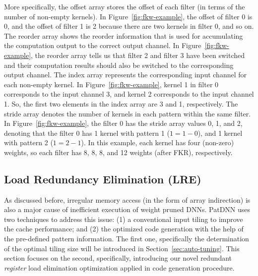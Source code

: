 \documentclass[sigplan,screen]{acmart}
\begin{document}
More specifically, the offset array stores the offset of each filter (in terms of the number of non-empty kernels). In Figure~\ref{fig:fkw-example}, the offset of filter 0 is 0, and the offset of filter 1 is 2 because there are two kernels in filter 0, and so on. 
The reorder array shows the reorder information that is used for accumulating the computation output to the correct output channel. In Figure~\ref{fig:fkw-example}, the reorder array tells us that filter 2 and filter 3 have been switched and their computation results should also be switched to the corresponding output channel. The index array represents the corresponding input channel for each non-empty kernel. In Figure~\ref{fig:fkw-example}, kernel 1 in filter 0 corresponds to the input channel 3, and kernel 2 corresponds to the input channel 1. So, the first two elements in the index array are 3 and 1, respectively. 
The stride array denotes the number of kernels in each pattern within the same filter. In Figure~\ref{fig:fkw-example}, the filter 0 has the stride array values 0, 1, and 2, denoting that
the filter 0 has 
1 kernel with pattern 1 ($1 = 1 - 0$), and 1 kernel with pattern 2 ($1 = 2 - 1$).
In this example, each kernel has four (non-zero) weights, so each filter has 8, 8, 8, and 12 weights (after FKR), respectively. 





\subsection{Load Redundancy Elimination (LRE)}\label{sec:redundancy}










As discussed before, irregular memory access (in the form of array indirection) is also a major cause of inefficient execution of weight pruned DNNs.   
PatDNN uses two techniques to address this issue: 
(1) a conventional input tiling to improve the cache performance; and 
(2) the optimized code generation
with the help of the pre-defined pattern information.
The first one, specifically the determination of the optimal tiling size  will be introduced in Section~\ref{sec:auto-tuning}. 
This section focuses on the second, specifically, introducing our novel redundant {\em register} load elimination optimization applied in code generation procedure.   
\end{document}
